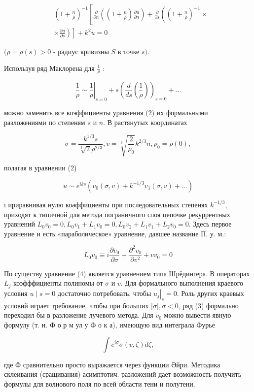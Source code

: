 \documentclass[10pt]{article}
\begin{document}
\[
\begin{aligned}
& \left(1+\frac{n}{\rho}\right)^{-1}\left[\frac{\partial}{\partial n}\left(\left(1+\frac{n}{\rho}\right) \frac{\partial u}{\partial n}\right)+\frac{\partial}{\partial s}\left(\left(1+\frac{n}{\rho}\right)^{-1} \times\right.\right. \\
& \left.\left.\times \frac{\partial u}{\partial s}\right)\right]+k^{2} u=0
\end{aligned}
\]

$(\rho=\rho(s)>0$ - радиус кривизны $S$ в точке $s)$.

Используя ряд Маклорена для $\frac{1}{\rho}$ :

\[
\left.\frac{1}{\rho} \sim \frac{1}{\rho}\right|_{s=0}+s\left(\frac{d}{d s}\left(\frac{1}{\rho}\right)\right)_{s=0}+\ldots
\]

можно заменить все коэффициенты уравнения (2) их формальными разложениями по степеням $s$ и $n$. В растянутых координатах

\[
\sigma=\frac{k^{1 / 3} s}{\sqrt[3]{2} \rho^{2 / 3}}, v=\sqrt[3]{\frac{2}{\rho_{0}}} k^{2 / 3} n, \rho_{0}=\rho(0),
\]

полагая в уравнении (2)

\[
u \sim e^{i k s}\left(v_{0}(\sigma, v)+k^{-1 / 3} v_{1}(\sigma, v)+\ldots\right)
\]

ı ириравнивая нулю коәффициенты при последовательных степенях $k^{-1 / 3}$, приходят к типичной для метода пограничного слоя цепочке рекуррентных уравнений $L_{0} v_{0}=0, L_{0} v_{1}+L_{1} v_{0}=0, L_{0} v_{2}+L_{1} v_{1}+L_{2} v_{0}=0$. Здесь первое уравнение и есть «параболическое» уравнение, давшее название П. у. м.:

\[
L_{0} v_{0} \equiv i \frac{\partial v_{0}}{\partial \sigma}+\frac{\partial^{2} v_{0}}{\partial v^{2}}+v v_{0}=0
\]

По существу уравнение (4) является уравнением типа Шрёдингера. В операторах $L_{j}$ коэфффициенты полиномы от $\sigma$ и $v$. Для формального выполнения краевого условия $u \mid s=0$ достаточно потребовать, чтобы $\left.u_{j}\right|_{s}=0$. Роль других краевых условий играет требование, чтобы при больших $|\sigma|, \sigma<0$, ряд (3) формально переходил бы в разложение лучевого метода. Для $v_{0}$ можно вывести явную формулу (т. н. Ф о р м ул у Ф о к а), имеющую вид интеграла Фурье

\[
\int e^{i \sigma} \sigma(v, \zeta) d \zeta,
\]

где Ф сравнительно просто выражается через функции Әйри. Методика склеивания (сращивания) асимптотич. разложений дает возможность получить формулы для волнового поля по всей области тени и полутени.
\end{document}

